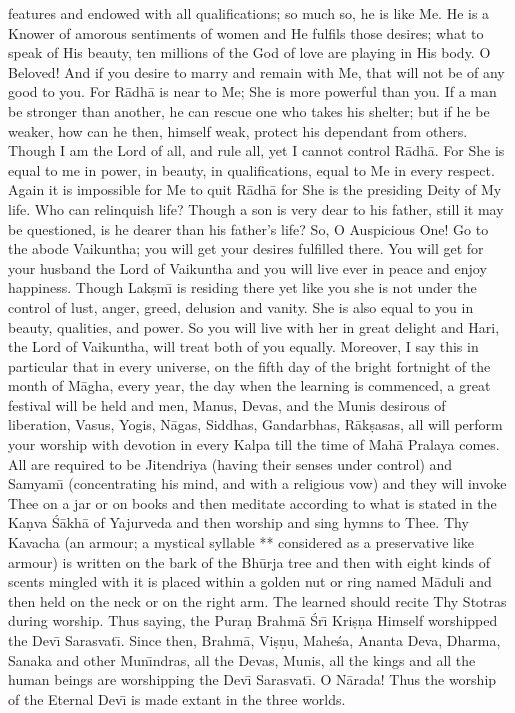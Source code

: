 features and endowed with all qualifications; so much so, he is like Me. He is a Knower of amorous sentiments of women and He fulfils those desires; what to speak of His beauty, ten millions of the God of love are playing in His body. O Beloved! And if you desire to marry and remain with Me, that will not be of any good to you. For R\=adh\=a is near to Me; She is more powerful than you. If a man be stronger than another, he can rescue one who takes his shelter; but if he be weaker, how can he then, himself weak, protect his dependant from others. Though I am the Lord of all, and rule all, yet I cannot control R\=adh\=a. For She is equal to me in power, in beauty, in qualifications, equal to Me in every respect. Again it is impossible for Me to quit R\=adh\=a for She is the presiding Deity of My life. Who can relinquish life? Though a son is very dear to his father, still it may be questioned, is he dearer than his father's life? So, O Auspicious One! Go to the abode Vaikuntha; you will get your desires fulfilled there. You will get for your husband the Lord of Vaikuntha and you will live ever in peace and enjoy happiness. Though Lak\d{s}m\={\i} is residing there yet like you she is not under the control of lust, anger, greed, delusion and vanity. She is also equal to you in beauty, qualities, and power. So you will live with her in great delight and Hari, the Lord of Vaikuntha, will treat both of you equally. Moreover, I say this in particular that in every universe, on the fifth day of the bright fortnight of the month of M\=agha, every year, the day when the learning is commenced, a great festival will be held and men, Manus, Devas, and the Munis desirous of liberation, Vasus, Yogis, N\=agas, Siddhas, Gandarbhas, R\=ak\d{s}asas, all will perform your worship with devotion in every Kalpa till the time of Mah\=a Pralaya comes. All are required to be Jitendriya (having their senses under control) and Samyam\={\i} (concentrating his mind, and with a religious vow) and they will invoke Thee on a jar or on books and then meditate according to what is stated in the Ka\d{n}va \'S\=akh\=a of Yajurveda and then worship and sing hymns to Thee. Thy Kavacha (an armour; a mystical syllable ** considered as a preservative like armour) is written on the bark of the Bh\=urja tree and then with eight kinds of scents mingled with it is placed within a golden nut or ring named M\=aduli and then held on the neck or on the right arm. The learned should recite Thy Stotras during worship. Thus saying, the Pura\d{n} Brahm\=a \'Sr\={\i} Kri\d{s}\d{n}a Himself worshipped the Dev\={\i} Sarasvat\={\i}. Since then, Brahm\=a, Vi\d{s}\d{n}u, Mahe\'sa, Ananta Deva, Dharma, Sanaka and other Mun\={\i}ndras, all the Devas, Munis, all the kings and all the human beings are worshipping the Dev\={\i} Sarasvat\={\i}. O N\=arada! Thus the worship of the Eternal Dev\={\i} is made extant in the three worlds.

